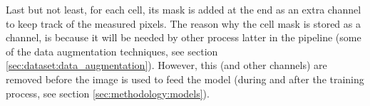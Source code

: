 Last but not least, for each cell, its mask is added at the end as an extra channel to keep track of the measured pixels. The reason why the cell mask is stored as a channel, is because it will be needed by other process latter in the pipeline (some of the data augmentation techniques, see section \ref{sec:dataset:data_augmentation}). However, this (and other channels) are removed before the image is used to feed the model (during and after the training process, see section \ref{sec:methodology:models}).

\begin{table}[!ht]
  \centering
\end{table}
